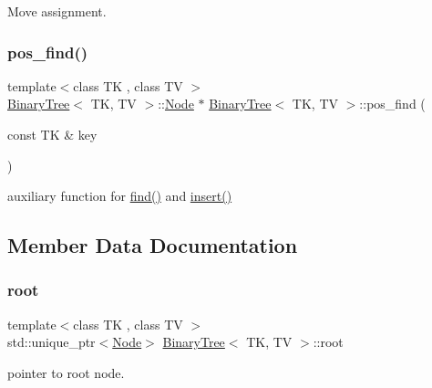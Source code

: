 Move assignment. \mbox{\label{classBinaryTree_a0a237f399143c32083d44623effa97ae}} 
\subsubsection{\texorpdfstring{pos\_find()}{pos\_find()}}
{\footnotesize\ttfamily template$<$class TK , class TV $>$ \\
\mbox{\hyperlink{classBinaryTree}{Binary\+Tree}}$<$ TK, TV $>$\+::\mbox{\hyperlink{structBinaryTree_1_1Node}{Node}} $\ast$ \mbox{\hyperlink{classBinaryTree}{Binary\+Tree}}$<$ TK, TV $>$\+::pos\+\_\+find (\begin{DoxyParamCaption}\item[{const TK \&}]{key }\end{DoxyParamCaption})}

auxiliary function for \mbox{\hyperlink{classBinaryTree_ae515b4f35af1e4f44a688cb8698471c8}{find()}} and \mbox{\hyperlink{classBinaryTree_a2e953ad45f601f1e94dbdb85c67f0bbb}{insert()}} 

\subsection{Member Data Documentation}
\mbox{\label{classBinaryTree_a787363fcf3a4109694808f03b3793614}} 
\subsubsection{\texorpdfstring{root}{root}}
{\footnotesize\ttfamily template$<$class TK , class TV $>$ \\
std\+::unique\+\_\+ptr$<$\mbox{\hyperlink{structBinaryTree_1_1Node}{Node}}$>$ \mbox{\hyperlink{classBinaryTree}{Binary\+Tree}}$<$ TK, TV $>$\+::root\hspace{0.3cm}{\ttfamily [private]}}

pointer to root node. \mbox{\label{classBinaryTree_a95c64190503d0c8f5f7878bfb4aaf841}} 
